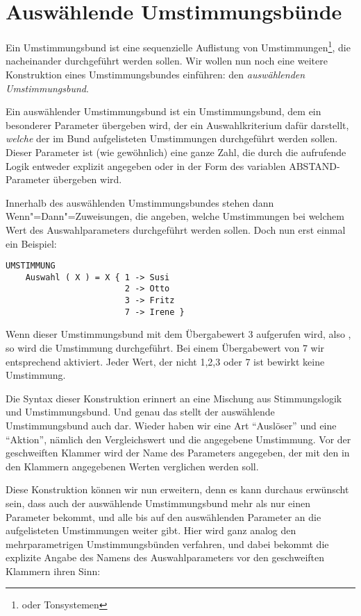 \section{Auswählende Umstimmungsbünde}\label{sec:ausw-umst}
Ein Umstimmungsbund ist eine sequenzielle Auflistung von 
Umstimmungen\footnote{oder Tonsystemen}, die nacheinander 
durchgeführt werden sollen. Wir wollen nun noch eine weitere 
Konstruktion eines Umstimmungsbundes einführen: den \emph{auswählenden 
Umstimmungsbund}.

Ein auswählender Umstimmungsbund ist ein Umstimmungsbund, dem ein 
besonderer Parameter übergeben wird, der ein Auswahlkriterium dafür 
darstellt, \emph{welche} der im Bund aufgelisteten Umstimmungen durchgeführt 
werden sollen. Dieser Parameter ist (wie gewöhnlich) eine ganze Zahl, 
die durch die aufrufende Logik entweder explizit angegeben oder in der 
Form des variablen ABSTAND-Parameter übergeben wird.

Innerhalb des auswählenden Umstimmungsbundes stehen dann 
Wenn"=Dann"=Zuweisungen, die angeben, welche Umstimmungen bei 
welchem Wert des Auswahlparameters durchgeführt werden sollen. Doch 
nun erst einmal ein Beispiel:

\begin{verbatim}
UMSTIMMUNG
    Auswahl ( X ) = X { 1 -> Susi
                        2 -> Otto
                        3 -> Fritz
                        7 -> Irene }
\end{verbatim}  

Wenn dieser Umstimmungsbund mit dem Übergabewert 3 aufgerufen wird, also 
 , so wird die Umstimmung  durchgeführt. Bei 
einem Übergabewert von 7 wir entsprechend  aktiviert. Jeder 
Wert, der nicht 1,2,3 oder 7 ist bewirkt keine Umstimmung.

Die Syntax dieser Konstruktion erinnert an eine Mischung aus 
Stimmungslogik und Umstimmungsbund. Und genau das stellt der auswählende 
Umstimmungsbund auch dar. Wieder haben wir eine Art "`Auslöser"' und 
eine "`Aktion"', nämlich den Vergleichswert und die angegebene Umstimmung. 
Vor der geschweiften Klammer wird der Name des Parameters angegeben, 
der mit den in den Klammern angegebenen Werten verglichen werden soll.

Diese Konstruktion können wir nun erweitern, denn es kann durchaus 
erwünscht sein, dass auch der auswählende Umstimmungsbund mehr als 
nur einen Parameter bekommt, und alle bis auf den auswählenden 
Parameter an die aufgelisteten Umstimmungen weiter gibt. Hier wird 
ganz analog den mehrparametrigen Umstimmungsbünden verfahren, und dabei 
bekommt die explizite Angabe des Namens des Auswahlparameters vor 
den geschweiften Klammern ihren Sinn:

